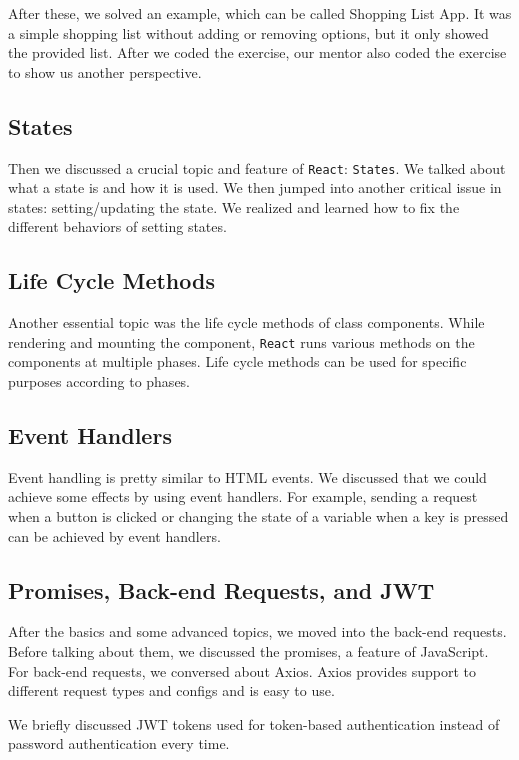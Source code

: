 After these, we solved an example, which can be called Shopping List App. It was a simple shopping list without adding or removing options, but it only showed the provided list. After we coded the exercise, our mentor also coded the exercise to show us another perspective.

\subsection{States}

Then we discussed a crucial topic and feature of \texttt{React}: \texttt{States}. We talked about what a state is and how it is used. We then jumped into another critical issue in states: setting/updating the state. We realized and learned how to fix the different behaviors of setting states.

\subsection{Life Cycle Methods}

Another essential topic was the life cycle methods of class components. While rendering and mounting the component, \texttt{React} runs various methods on the components at multiple phases. Life cycle methods can be used for specific purposes according to phases.

\subsection{Event Handlers}

Event handling is pretty similar to HTML events. We discussed that we could achieve some effects by using event handlers. For example, sending a request when a button is clicked or changing the state of a variable when a key is pressed can be achieved by event handlers.

\subsection{Promises, Back-end Requests, and JWT}

After the basics and some advanced topics, we moved into the back-end requests. Before talking about them, we discussed the promises, a feature of JavaScript. For back-end requests, we conversed about Axios. Axios provides support to different request types and configs and is easy to use.

We briefly discussed JWT tokens used for token-based authentication instead of password authentication every time.
